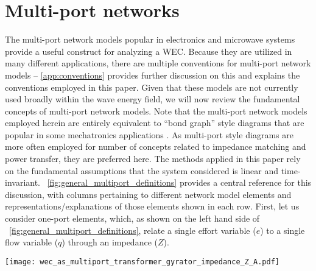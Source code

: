 \documentclass[5p,times]{elsarticle}
\begin{document}
\section{Multi-port networks}\label{sec:multi_port_networks}
The multi-port network models popular in electronics and microwave systems~\cite{Marrocco:2008aa,CircuitFundamental} provide a useful construct for analyzing a WEC.
Because they are utilized in many different applications, there are multiple conventions for multi-port network models -- \ref{app:conventions} provides further discussion on this and explains the conventions employed in this paper.
Given that these models are not currently used broadly within the wave energy field, we will now review the fundamental concepts of multi-port network models.
Note that the multi-port network models employed herein are entirely equivalent to ``bond graph'' style diagrams that are popular in some mechatronics applications \cite{Karnopp:2012aa}.
As multi-port style diagrams are more often employed for number of concepts related to impedance matching and power transfer, they are preferred here.
The methods applied in this paper rely on the fundamental assumptions that the system considered is linear and time-invariant.
\figurename~\ref{fig:general_multiport_definitions} provides a central reference for this discussion, with columns pertaining to different network model elements and representations/explanations of those elements shown in each row.
First, let us consider one-port elements, which, as shown on the left hand side of \figurename~\ref{fig:general_multiport_definitions}, relate a single effort variable ($e$) to a single flow variable ($q$) through an impedance ($Z$).

\begin{figure*}[tb]
	\centering
	\texttt{[image: wec\_as\_multiport\_transformer\_gyrator\_impedance\_Z\_A.pdf]}
	\caption{General one- and two-port elements definitions (see \ref{app:conventions} for more on sign conventions).}
	\label{fig:general_multiport_definitions}
\end{figure*}
\end{document}
